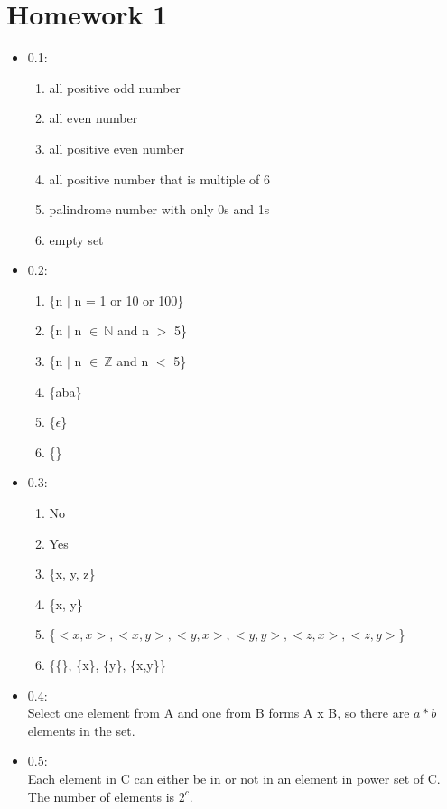 \documentclass[12pt]{article}
\begin{document}
\section*{Homework 1}

\begin{itemize}
	\item 0.1: 
	\begin{enumerate}[label=(\alph*)]
		\item all positive odd number
		\item all even number
		\item all positive even number
		\item all positive number that is multiple of 6
		\item palindrome number with only 0s and 1s
		\item empty set
	\end{enumerate}

	\item 0.2: 
	\begin{enumerate}[label=(\alph*)]
		\item \{n $|$ n = 1 or 10 or 100\}
		\item \{n $|$ n $\in \: \mathbb{N}$ and n $>$ 5\}
		\item \{n $|$ n $\in \: \mathbb{Z}$ and n $<$ 5\}
		\item \{aba\}
		\item \{$\epsilon$\}
		\item \{\}
	\end{enumerate}

	\item 0.3: 
	\begin{enumerate}[label=(\alph*)]
		\item No
		\item Yes
		\item \{x, y, z\}
		\item \{x, y\}
		\item \{$<x,x>, <x,y>, <y,x>, <y,y>, <z,x>, <z,y>$\}
		\item \{\{\}, \{x\}, \{y\}, \{x,y\}\}
	\end{enumerate}

	\item 0.4: 	\\
		\hspace*{5mm} Select one element from A and one from B forms A x B, so there are $a*b$ elements in the set. 

	\item 0.5: 	\\
		\hspace*{5mm} Each element in C can either be in or not in an element in power set of C. The number of elements is $2^c$. 


\end{itemize}
\end{document}
